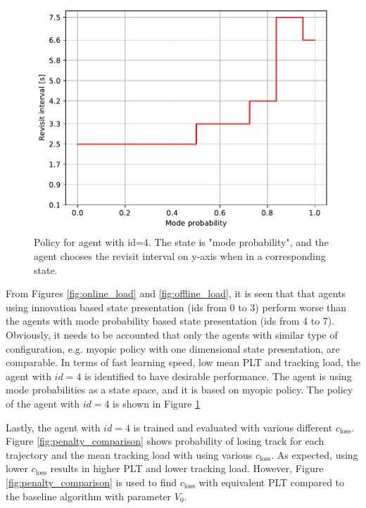 \documentclass[english, 12pt, a4paper, elec, utf8, a-1b, online]{aaltothesis}
\newcommand{\closs}{c_\text{loss}}
\begin{document}
\begin{figure}[b]
    \centering
    \includegraphics[width=.7\linewidth]{figures/benchmark/Simulations/policy.pdf}
    \caption{Policy for agent with id=4. The state is "mode probability", and the agent chooses the revisit interval on y-axis when in a corresponding state.}
    \label{fig:policy_id4}
\end{figure}

From Figures \ref{fig:online_load} and \ref{fig:offline_load}, it is seen that that agents using innovation based state presentation (ids from 0 to 3) perform worse than the agents with mode probability based state presentation (ids from 4 to 7).
Obviously, it needs to be accounted that only the agents with similar type of configuration, e.g. myopic policy with one dimensional state presentation, are comparable.
In terms of fast learning speed, low mean PLT and tracking load, the agent with $id=4$ is identified to have desirable performance.
The agent is using mode probabilities as a state space, and it is based on myopic policy.
The policy of the agent with $id=4$ is shown in Figure \ref{fig:policy_id4}

Lastly, the agent with $id=4$ is trained and evaluated with various different $\closs$.
Figure \ref{fig:penalty_comparison} shows probability of losing track for each trajectory and the mean tracking load with using various $\closs$.
As expected, using lower $\closs$ results in higher PLT and lower tracking load.
However, Figure \ref{fig:penalty_comparison} is used to find $\closs$ with equivalent PLT compared to the baseline algorithm with parameter $V_0$. 
\end{document}
